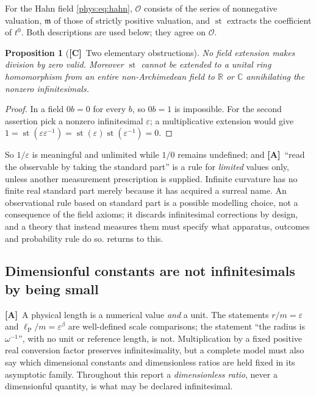 \documentclass[11pt,letterpaper]{article}
\numberwithin{equation}{section}
\newtheorem{proposition}[theorem]{Proposition}
\theoremstyle{definition}
\theoremstyle{remark}
\newcommand{\R}{\mathbb R}
\newcommand{\C}{\mathbb C}
\newcommand{\eps}{\varepsilon}
\newcommand{\Ofin}{\mathcal O}
\newcommand{\mm}{\mathfrak m}
\newcommand{\lP}{\ell_{\mathrm P}}
\DeclareMathOperator{\st}{st}
\newcommand{\TC}{\textcolor{TierC}{\textsf{\bfseries[C]}}}
\newcommand{\TA}{\textcolor{TierA}{\textsf{\bfseries[A]}}}
\begin{document}
For the Hahn field \eqref{phys:eq:hahn}, $\Ofin$ consists of the series of
nonnegative valuation, $\mm$ of those of strictly positive valuation, and
$\st$ extracts the coefficient of $t^{0}$. Both descriptions are used below;
they agree on $\Ofin$.

\begin{proposition}[\TC\ Two elementary obstructions]
\label{phys:prop:elementary}
No field extension makes division by zero valid. Moreover $\st$ cannot be
extended to a unital ring homomorphism from an entire non-Archimedean field to
$\R$ or $\C$ annihilating the nonzero infinitesimals.
\end{proposition}
\begin{proof}
In a field $0b=0$ for every $b$, so $0b=1$ is impossible. For the second
assertion pick a nonzero infinitesimal $\eps$; a multiplicative extension
would give $1=\st(\eps\eps^{-1})=\st(\eps)\st(\eps^{-1})=0$.
\end{proof}

So $1/\eps$ is meaningful and unlimited while $1/0$ remains undefined; and
\TA\ ``read the observable by taking the standard part'' is a rule for
\emph{limited} values only, unless another measurement prescription is
supplied. Infinite curvature has no finite real standard part merely because it
has acquired a surreal name. An observational rule based on standard part is a
possible modelling choice, not a consequence of the field axioms; it discards
infinitesimal corrections by design, and a theory that instead measures them
must specify what apparatus, outcomes and probability rule do so.
 returns to this.

\subsection{Dimensionful constants are not infinitesimals by being small}
\label{phys:sub:units}

\TA\ A physical length is a numerical value \emph{and} a unit. The statements
$r/m=\eps$ and $\lP/m=\eps^{\beta}$ are well-defined scale comparisons; the
statement ``the radius is $\omega^{-1}$'', with no unit or reference length, is
not. Multiplication by a fixed positive real conversion factor preserves
infinitesimality, but a complete model must also say which dimensional
constants and dimensionless ratios are held fixed in its asymptotic family.
Throughout this report a \emph{dimensionless ratio}, never a dimensionful
quantity, is what may be declared infinitesimal.
\end{document}
